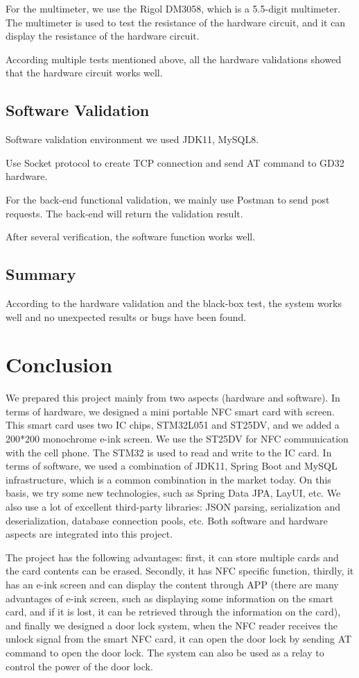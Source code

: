 \documentclass[11pt, a4paper]{article}
\begin{document}
For the multimeter, we use the Rigol DM3058, which is a 5.5-digit multimeter.
The multimeter is used to test the resistance of the hardware circuit, and it can display the resistance of the hardware circuit.

According multiple tests mentioned above, all the hardware validations showed that the hardware circuit works well.
\subsection{Software Validation}
Software validation environment we used JDK11, MySQL8.

Use Socket protocol to create TCP connection and send AT command to GD32 hardware.

For the back-end functional validation, we mainly use Postman to send post requests. The back-end will return the validation result.

After several verification, the software function works well.

\subsection{Summary}
According to the hardware validation and the black-box test, the system works well and no unexpected results or bugs have been found.

\section{Conclusion}

We prepared this project mainly from two aspects (hardware and software). In terms of hardware, we designed a mini portable NFC smart card with screen. This smart card uses two IC chips, STM32L051 and ST25DV, and we added a 200*200 monochrome e-ink screen. We use the ST25DV for NFC communication with the cell phone. The STM32 is used to read and write to the IC card. In terms of software, we used a combination of JDK11, Spring Boot and MySQL infrastructure, which is a common combination in the market today. On this basis, we try some new technologies, such as Spring Data JPA, LayUI, etc. We also use a lot of excellent third-party libraries: JSON parsing, serialization and deserialization, database connection pools, etc. Both software and hardware aspects are integrated into this project.

The project has the following advantages: first, it can store multiple cards and the card contents can be erased. Secondly, it has NFC specific function, thirdly, it has an e-ink screen and can display the content through APP (there are many advantages of e-ink screen, such as displaying some information on the smart card, and if it is lost, it can be retrieved through the information on the card), and finally we designed a door lock system, when the NFC reader receives the unlock signal from the smart NFC card, it can open the door lock by sending AT command to open the door lock. The system can also be used as a relay to control the power of the door lock.
\end{document}
